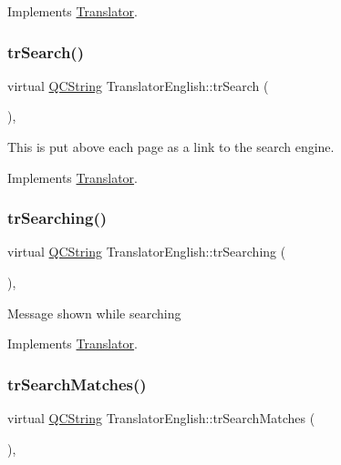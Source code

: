 Implements \mbox{\hyperlink{class_translator}{Translator}}.

\mbox{\label{class_translator_english_acbc2b84733f21ccf2e8fda6a4d67c090}} 
\subsubsection{\texorpdfstring{trSearch()}{trSearch()}}
{\footnotesize\ttfamily virtual \mbox{\hyperlink{class_q_c_string}{Q\+C\+String}} Translator\+English\+::tr\+Search (\begin{DoxyParamCaption}{ }\end{DoxyParamCaption})\hspace{0.3cm}{\ttfamily [inline]}, {\ttfamily [virtual]}}

This is put above each page as a link to the search engine. 

Implements \mbox{\hyperlink{class_translator}{Translator}}.

\mbox{\label{class_translator_english_a14aa8a93b1229838934443f5f19149a4}} 
\subsubsection{\texorpdfstring{trSearching()}{trSearching()}}
{\footnotesize\ttfamily virtual \mbox{\hyperlink{class_q_c_string}{Q\+C\+String}} Translator\+English\+::tr\+Searching (\begin{DoxyParamCaption}{ }\end{DoxyParamCaption})\hspace{0.3cm}{\ttfamily [inline]}, {\ttfamily [virtual]}}

Message shown while searching 

Implements \mbox{\hyperlink{class_translator}{Translator}}.

\mbox{\label{class_translator_english_a2dc6dc941e9ad5b2a7eb8a144164108a}} 
\subsubsection{\texorpdfstring{trSearchMatches()}{trSearchMatches()}}
{\footnotesize\ttfamily virtual \mbox{\hyperlink{class_q_c_string}{Q\+C\+String}} Translator\+English\+::tr\+Search\+Matches (\begin{DoxyParamCaption}{ }\end{DoxyParamCaption})\hspace{0.3cm}{\ttfamily [inline]}, {\ttfamily [virtual]}}

